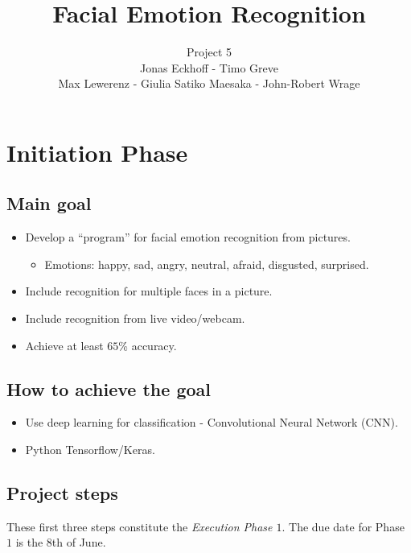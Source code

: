 \documentclass[]{article}
\begin{document}
\author{Project 5\\
Jonas Eckhoff - Timo Greve\\ 
Max Lewerenz - Giulia Satiko Maesaka - John-Robert Wrage}
\title{Facial Emotion Recognition}
\maketitle{}

\section{Initiation Phase}
\subsection{Main goal}
\begin{itemize}
\item Develop a ``program'' for facial emotion recognition from pictures.
    \begin{itemize}
    \item Emotions: happy, sad, angry, neutral, afraid, disgusted, surprised. 
    \end{itemize}
\item Include recognition for multiple faces in a picture.
\item Include recognition from live video/webcam.
\item Achieve at least $65$\% accuracy.
\end{itemize}


\subsection{How to achieve the goal}
\begin{itemize}
\item Use deep learning for classification - Convolutional Neural Network (CNN).
\item Python Tensorflow/Keras.
\end{itemize}

\subsection{Project steps}

These first three steps constitute the \textit{Execution Phase $1$}. The due date for Phase $1$ is the 8th of June.
\end{document}
